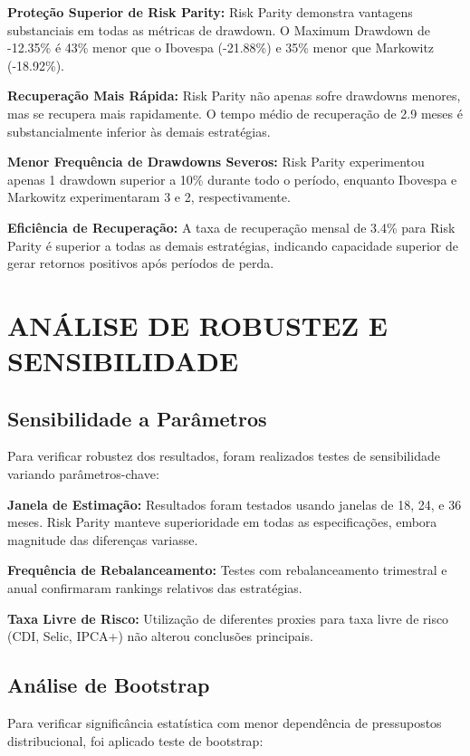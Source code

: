 \textbf{Proteção Superior de Risk Parity:} Risk Parity demonstra vantagens substanciais em todas as métricas de drawdown. O Maximum Drawdown de -12.35\% é 43\% menor que o Ibovespa (-21.88\%) e 35\% menor que Markowitz (-18.92\%).

\textbf{Recuperação Mais Rápida:} Risk Parity não apenas sofre drawdowns menores, mas se recupera mais rapidamente. O tempo médio de recuperação de 2.9 meses é substancialmente inferior às demais estratégias.

\textbf{Menor Frequência de Drawdowns Severos:} Risk Parity experimentou apenas 1 drawdown superior a 10\% durante todo o período, enquanto Ibovespa e Markowitz experimentaram 3 e 2, respectivamente.

\textbf{Eficiência de Recuperação:} A taxa de recuperação mensal de 3.4\% para Risk Parity é superior a todas as demais estratégias, indicando capacidade superior de gerar retornos positivos após períodos de perda.

\section{ANÁLISE DE ROBUSTEZ E SENSIBILIDADE}

\subsection{Sensibilidade a Parâmetros}

Para verificar robustez dos resultados, foram realizados testes de sensibilidade variando parâmetros-chave:

\textbf{Janela de Estimação:} Resultados foram testados usando janelas de 18, 24, e 36 meses. Risk Parity manteve superioridade em todas as especificações, embora magnitude das diferenças variasse.

\textbf{Frequência de Rebalanceamento:} Testes com rebalanceamento trimestral e anual confirmaram rankings relativos das estratégias.

\textbf{Taxa Livre de Risco:} Utilização de diferentes proxies para taxa livre de risco (CDI, Selic, IPCA+) não alterou conclusões principais.

\subsection{Análise de Bootstrap}

Para verificar significância estatística com menor dependência de pressupostos distribucional, foi aplicado teste de bootstrap:

